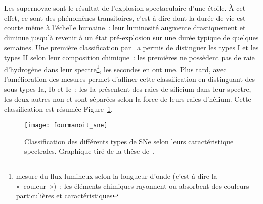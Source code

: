 \documentclass[../main/main.tex]{subfiles}
\begin{document}
Les supernovae sont le résultat de l'explosion spectaculaire d'une étoile. À cet
effet, ce sont des phénomènes transitoires, c'est-à-dire dont la durée de vie
est courte même à l'échelle humaine~: leur luminosité augmente drastiquement et
diminue jusqu'à revenir à un état pré-explosion sur une durée typique de
quelques semaines. Une première classification par~\cite{minkowski1941} a permis
de distinguer les types I et les types II selon leur composition chimique~: les
premières ne possèdent pas de raie d'hydrogène dans leur spectre\footnote{mesure
du flux lumineux selon la longueur d'onde (c'est-à-dire la «~couleur~»)~: les
éléments chimiques rayonnent ou absorbent des couleurs particulières et
caractéristiques}, les secondes en ont une. Plus tard, \cite{elias1985} avec
l'amélioration des mesures permet d'affiner cette classification en distinguant
des sous-types Ia, Ib et Ic~: les Ia présentent des raies de silicium dans leur
spectre, les deux autres non et sont séparées selon la force de leurs raies
d'hélium. Cette classification est résumée Figure~\ref{fig:sne_class}.

\begin{figure}[ht]
    \centering
    \texttt{[image: fourmanoit\_sne]}
    \caption[Classification des différents types de SNe selon leurs
    caractéristique spectrales]{Classification des différents types de SNe selon
        leurs caractéristique spectrales. Graphique tiré de la thèse
    de~\cite{fourmanoit2010}.}\label{fig:sne_class}
\end{figure}
\end{document}
